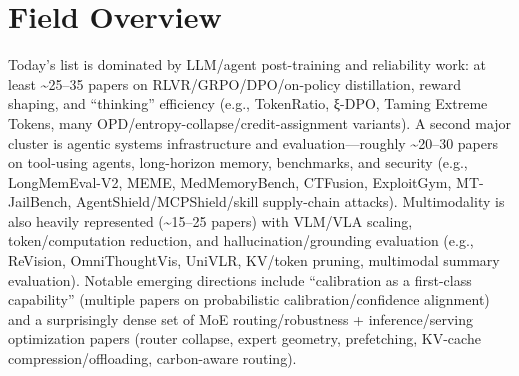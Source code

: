 \documentclass[12pt,letterpaper]{article}
\begin{document}
\section*{Field Overview}
{\footnotesize Today's list is dominated by LLM/agent post-training and reliability work: at least \textasciitilde{}25--35 papers on RLVR/GRPO/DPO/on-policy distillation, reward shaping, and ``thinking'' efficiency (e.g., TokenRatio, ξ-DPO, Taming Extreme Tokens, many OPD/entropy-collapse/credit-assignment variants). A second major cluster is agentic systems infrastructure and evaluation---roughly \textasciitilde{}20--30 papers on tool-using agents, long-horizon memory, benchmarks, and security (e.g., LongMemEval-V2, MEME, MedMemoryBench, CTFusion, ExploitGym, MT-JailBench, AgentShield/MCPShield/skill supply-chain attacks). Multimodality is also heavily represented (\textasciitilde{}15--25 papers) with VLM/VLA scaling, token/computation reduction, and hallucination/grounding evaluation (e.g., ReVision, OmniThoughtVis, UniVLR, KV/token pruning, multimodal summary evaluation). Notable emerging directions include ``calibration as a first-class capability'' (multiple papers on probabilistic calibration/confidence alignment) and a surprisingly dense set of MoE routing/robustness + inference/serving optimization papers (router collapse, expert geometry, prefetching, KV-cache compression/offloading, carbon-aware routing).}
\end{document}
